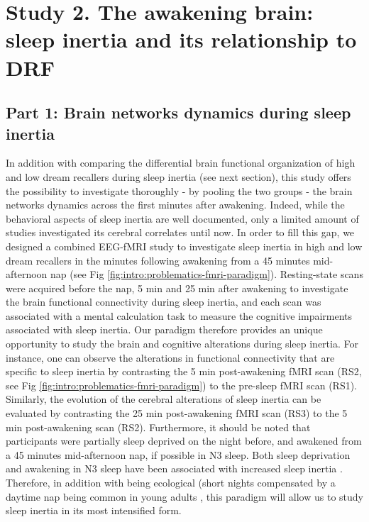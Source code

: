 \section{Study 2. The awakening brain: sleep inertia and its relationship to DRF}
\label{sec:problematic:inertia}

\subsection{Part 1: Brain networks dynamics during sleep inertia}
\label{sec:problematic:inertia:overview}

In addition with comparing the differential brain functional organization of high and low dream recallers during sleep inertia (see next section), this study offers the possibility to investigate thoroughly - by pooling the two groups - the brain networks dynamics across the first minutes after awakening. Indeed, while the behavioral aspects of sleep inertia are well documented, only a limited amount of studies investigated its cerebral correlates until now. In order to fill this gap, we designed a combined EEG-fMRI study to investigate sleep inertia in high and low dream recallers in the minutes following awakening from a 45 minutes mid-afternoon nap (see Fig \ref{fig:intro:problematics-fmri-paradigm}). Resting-state scans were acquired before the nap, 5 min and 25 min after awakening to investigate the brain functional connectivity during sleep inertia, and each scan was associated with a mental calculation task to measure the cognitive impairments associated with sleep inertia. Our paradigm therefore provides an unique opportunity to study the brain and cognitive alterations during sleep inertia. For instance, one can observe the alterations in functional connectivity that are specific to sleep inertia by contrasting the 5 min post-awakening fMRI scan (RS2, see Fig \ref{fig:intro:problematics-fmri-paradigm}) to the pre-sleep fMRI scan (RS1). Similarly, the evolution of the cerebral alterations of sleep inertia can be evaluated by contrasting the 25 min post-awakening fMRI scan (RS3) to the 5 min post-awakening scan (RS2). Furthermore, it should be noted that participants were partially sleep deprived on the night before, and awakened from a 45 minutes mid-afternoon nap, if possible in N3 sleep. Both sleep deprivation and awakening in N3 sleep have been associated with increased sleep inertia \citep{tassi_sleep_2000}. Therefore, in addition with being ecological (short nights compensated by a daytime nap being common in young adults \citep{faraut_napping:_2016}, this paradigm will allow us to study sleep inertia in its most intensified form.

